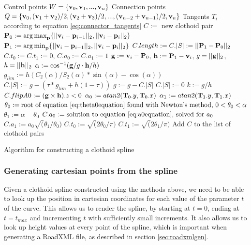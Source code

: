 \begin{algorithm}[ht]
\centering
\begin{algorithmic}
\REQUIRE Control points $W=\{{\mathbf v}_0, {\mathbf v}_1, ..., {\mathbf v}_n\}$
\REQUIRE Connection points $Q=\{{\mathbf v}_0, ({\mathbf v}_1+{\mathbf v}_2)/2, ({\mathbf v}_2+{\mathbf v}_3)/2, ..., ({\mathbf v}_{n-2}+{\mathbf v}_{n-1})/2, {\mathbf v}_n\}$
\REQUIRE Tangents $T_i$ according to equation \ref{eq:connector_tangents}
\STATE $C := $ new clothoid pair
\STATE ${\mathbf P}_0 := \operatorname*{arg\,max}_{{\mathbf p}} \{||{\mathbf v}_i-{\mathbf p}_{i-1}||_2, ||{\mathbf v}_i-{\mathbf p}_i||_2\}$
\STATE ${\mathbf P}_1 := \operatorname*{arg\,min}_{{\mathbf p}} \{||{\mathbf v}_i-{\mathbf p}_{i-1}||_2, ||{\mathbf v}_i-{\mathbf p}_i||_2\}$
\STATE $C.length := C.|S| := ||{\mathbf P}_1 - {\mathbf P}_0||_2$
\STATE $C.t_0 := C.t_1 := 0$, $C.a_0 := C.a_1 := 1$
\ENDIF
\STATE ${\mathbf g} := {\mathbf v}_i-{\mathbf P}_0$, ${\mathbf h} := {\mathbf P}_1-{\mathbf v}_i$, $g = ||{\mathbf g}||_2$, $h = ||{\mathbf h}||_2$
\STATE $\alpha := \cos^{-1}({\mathbf g}/g \cdot {\mathbf h}/h)$
\STATE $g_{lim} := h(C_2(\alpha)/S_2(\alpha)*\sin(\alpha) - \cos(\alpha))$
    \STATE $C.|S| := g - (\tau*g_{lim} + h(1-\tau))$
    \STATE $g := g - C.|S|$
\ELSE
    \STATE $C.|S| := 0$
\ENDIF
\STATE $k := g/h$
\STATE $C.flipA0 := ({\mathbf g} \times {\mathbf h}).z < 0$
\STATE $\alpha_0 := atan2({\mathbf T}_0.y, {\mathbf T}_0.x)$
\STATE $\alpha_1 := atan2({\mathbf T}_1.y, {\mathbf T}_1.x)$
\STATE {}
\STATE $\theta_0 := \mbox{root of equation \ref{eq:theta0equation} found with Newton's method, $0 < \theta_0 < \alpha$}$
\STATE $\theta_1 := \alpha - \theta_0$
\STATE $C.a_0 := \mbox{solution to equation \ref{eq:a0equation}, solved for $a_0$}$
\STATE $C.a_1 := a_0\sqrt(\theta_1/\theta_0)$
\STATE $C.t_0 := \sqrt(2\theta_0/\pi)$
\STATE $C.t_1 := \sqrt(2\theta_1/\pi)$
\STATE Add $C$ to the list of clothoid pairs
\ENDFOR
\end{algorithmic}

\caption{Algorithm for constructing a clothoid spline}
\label{alg:clothoid_spline_construct}
\end{algorithm}

\subsubsection{Generating cartesian points from the spline}
Given a clothoid spline constructed using the methods above, we need to be able to look up the position in cartesian coordinates for each value of the parameter $t$ of the curve. This allows us to render the spline, by starting at $t=0$, ending at $t=t_{max}$ and incrementing $t$ with sufficiently small increments. It also allows us to look up height values at every point of the spline, which is important when generating a RoadXML file, as described in section \ref{sec:roadxmlgen}.

